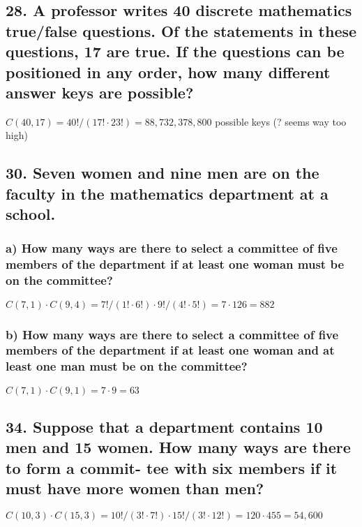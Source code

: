 \documentclass[11pt, oneside]{article} %
\numberwithin{equation}{section} %
\numberwithin{figure}{section} %
\numberwithin{table}{section} %
\begin{document}

\subsection{28. A professor writes 40 discrete mathematics true/false questions. Of the statements in these questions, 17 are true. If the questions can be positioned in any order, how many different answer keys are possible?}
$C(40,17) = 40!/(17!\cdot 23!) = 88,732,378,800$ possible keys (? seems way too high) 


\subsection{30. Seven women and nine men are on the faculty in the mathematics department at a school.}
\subsubsection{a) How many ways are there to select a committee of five members of the department if at least one woman must be on the committee?}
$C(7,1)\cdot C(9,4) = 7!/(1!\cdot 6!) \cdot 9!/(4!\cdot 5!) = 7\cdot 126 = 882$
\subsubsection{b) How many ways are there to select a committee of five members of the department if at least one woman and at least one man must be on the committee?}
$C(7,1) \cdot C(9,1) = 7 \cdot 9 = 63$

\subsection{34. Suppose that a department contains 10 men and 15 women. How many ways are there to form a commit- tee with six members if it must have more women than men?}
$C(10,3) \cdot C(15,3) = 10!/(3! \cdot 7!) \cdot 15!/(3!\cdot 12!) = 120 \cdot 455 = 54,600$
\end{document}
